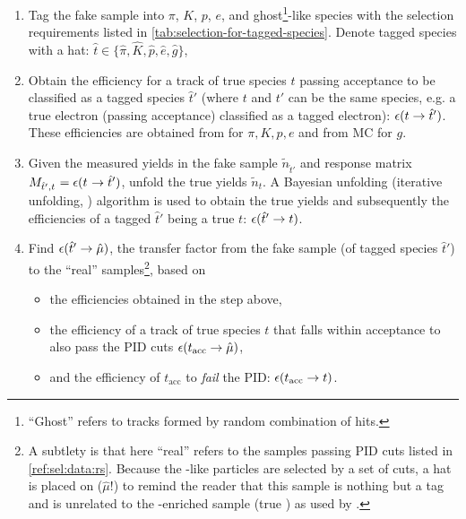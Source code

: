 \begin{enumerate}
    \item Tag the fake \muon sample into $\pi$, $K$, $p$,
        $e$, and ghost\footnote{
            ``Ghost'' refers to tracks formed by random combination of hits.
        }-like species with the selection requirements listed in
        \cref{tab:selection-for-tagged-species}.
        Denote tagged species with a hat:
        $\hat{t} \in \{\hat{\pi}, \hat{K}, \hat{p}, \hat{e}, \hat{g}\}$,

    \item Obtain the efficiency for a track of true species $t$ passing \muon
        acceptance to be classified as a tagged species $\hat{t}'$
        (where $t$ and $t'$ can be the same species, e.g. a true electron
        (passing \muon acceptance) classified as a tagged electron):
        $\misEff[t]{\hat{t}'}$.
        These efficiencies are obtained from \pidcalib for $\pi, K, p, e$ and
        from MC for $g$.

    \item Given the measured yields in the fake \muon sample $\tilde{n}_{\hat{t}'}
        $ and response matrix
        $M_{\hat{t}', t^{\phantom{}}} = \misEff[t^{\phantom{}}]{\hat{t}'}$,
        unfold the true yields $\tilde{n}_{t}$.
        A Bayesian unfolding (iterative unfolding, \cite{DAGOSTINI1995487})
        algorithm is used to obtain the true yields and subsequently the
        efficiencies of a tagged
        $\hat{t}'$ being a true $t$: $\misEff[\hat{t}']{t}$.

      \item Find $\misEff[\hat{t}']{\hat{\mu}}$,
        the transfer factor from the fake \muon sample
        (of tagged species $\hat{t}'$) to the ``real'' \muon
        samples\footnote{
            A subtlety is that here ``real'' \muon refers to the samples passing
            \muon PID cuts listed in \cref{ref:sel:data:rs}.
            Because the \muon-like particles are selected by a set of cuts,
            a hat is placed on \muon ($\hat{\mu}$!)
            to remind the reader that this sample is nothing but a \muon tag
            and is unrelated to the \muon-enriched sample (true \muon) as used
            by \pidcalib.
        },
        based on
        \begin{itemize}
            \item the efficiencies obtained in the step above,
            \item the efficiency of a track of true species $t$ that falls
                within \muon acceptance to also pass the \muon PID cuts
                $\misEff[t_\text{acc}]{\hat{\mu}}$,
            \item and the efficiency of $t_\text{acc}$ to \emph{fail} the \muon
                PID:
                $\misEff[t_\text{acc}]{t}$.
        \end{itemize}


\end{enumerate}
